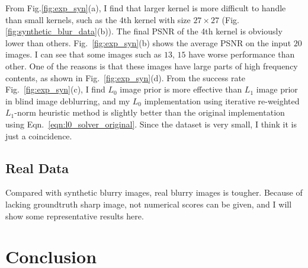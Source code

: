 \documentclass[journal, onecolumn, 10pt]{IEEEtran}
\begin{document}
From Fig.\ref{fig:exp_syn}(a), I find that larger kernel is more difficult to handle than small kernels, such as the 4th kernel with size $27 \times 27$ (Fig.\ref{fig:synthetic_blur_data}(b)). The final PSNR of the 4th kernel is obviously lower than others. Fig.~\ref{fig:exp_syn}(b) shows the average PSNR on the input $20$ images. I can see that some images such as $13$, $15$ have worse performance than other. One of the reasons is that these images have large parts of high frequency contents, as shown in Fig.~\ref{fig:exp_syn}(d). From the success rate Fig.~\ref{fig:exp_syn}(c), I find $L_0$ image prior is more effective than $L_1$ image prior in blind image deblurring, and my $L_0$ implementation using iterative re-weighted $L_1$-norm heuristic method is slightly better than the original implementation using Eqn.~\ref{eqn:l0_solver_original}. Since the dataset is very small, I think it is just a coincidence. 

\subsection{Real Data}
Compared with synthetic blurry images, real blurry images is tougher. Because of lacking groundtruth sharp image, not numerical scores can be given, and I will show some representative results here.
 
\section{Conclusion}

\newpage




\end{document}
